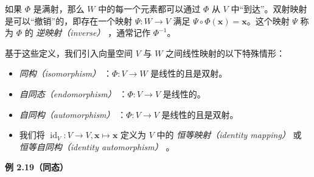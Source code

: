 如果 $ \Phi $ 是满射，那么 $ W $ 中的每一个元素都可以通过 $ \Phi $ 从 $ V $ 中“到达”。双射映射是可以“撤销”的，即存在一个映射 $ \Psi : W \to V $ 满足 $ \Psi \circ \Phi(\boldsymbol{x}) = \boldsymbol{x} $。这个映射 $ \Psi $ 称为 $ \Phi $ 的 \emph{逆映射（inverse）} ，通常记作 $ \Phi^{-1} $。

基于这些定义，我们引入向量空间 $ V $ 与 $ W $ 之间线性映射的以下特殊情形：

\begin{itemize}
\item \emph{同构（isomorphism）} ：$ \Phi : V \to W $ 是线性的且是双射。
\item \emph{自同态（endomorphism）} ：$ \Phi : V \to V $ 是线性的。
\item \emph{自同构（automorphism）} ：$ \Phi : V \to V $ 是线性的且是双射。
\item 我们将 $ \operatorname{id}_V : V \to V, \boldsymbol{x} \mapsto \boldsymbol{x} $ 定义为 $ V $ 中的 \emph{恒等映射（identity mapping）} 或 \emph{恒等自同构（identity automorphism）} 。
\end{itemize}

\begin{notebox}
\textbf{例 2.19（同态）}
\end{notebox}

